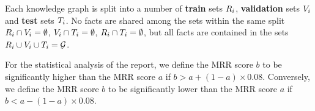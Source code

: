 Each knowledge graph is split into a number of \textbf{train} sets $R_i$, \textbf{validation} sets $V_i$ and \textbf{test} sets $T_i$. No facts are shared among the sets within the same split $R_i \cap V_i = \emptyset$, $V_i \cap T_i = \emptyset$, $R_i \cap T_i = \emptyset$, but all facts are contained in the sets $R_i \cup V_i \cup T_i = \mathcal{G}$.

For the statistical analysis of the report, we define the MRR score $b$ to be significantly higher than the MRR score $a$ if $b > a + (1-a) \times 0.08$. Conversely, we define the MRR score $b$ to be significantly lower than the MRR score $a$ if $b < a - (1-a) \times 0.08$.

